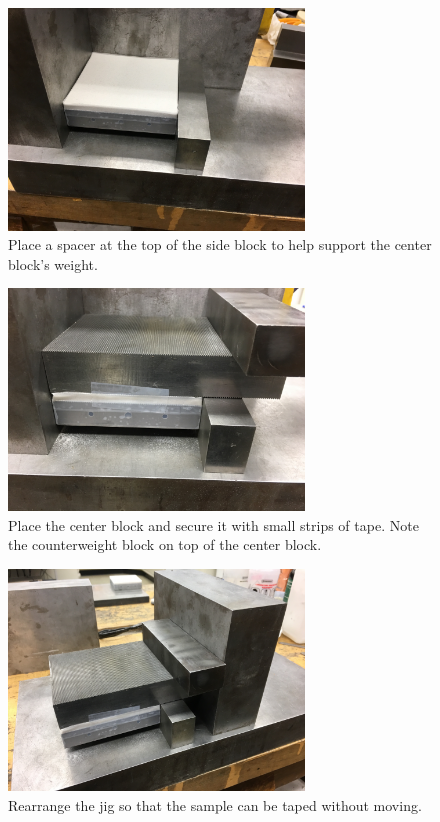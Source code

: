 \clearpage

\begin{figure}
	\centering
        \includegraphics[width=0.7\textwidth]{appendix_sample_prep/dds_sideblock_jig_2.jpg}
   	\caption{Place a spacer at the top of the side block to help support the center block's weight.}
  	\label{Fig:dds_sideblock_jig_2}
\end{figure}

\begin{figure}
	\centering
        \includegraphics[width=0.7\textwidth]{appendix_sample_prep/dds_centerblock_jig.jpg}
   	\caption{Place the center block and secure it with small strips of tape. Note the counterweight block on top of the center block.}
  	\label{Fig:dds_centerblock_jig}
\end{figure}

\begin{figure}
	\centering
        \includegraphics[width=0.7\textwidth]{appendix_sample_prep/dds_move_block.jpg}
   	\caption{Rearrange the jig so that the sample can be taped without moving.}
  	\label{Fig:dds_move_block}
\end{figure}

